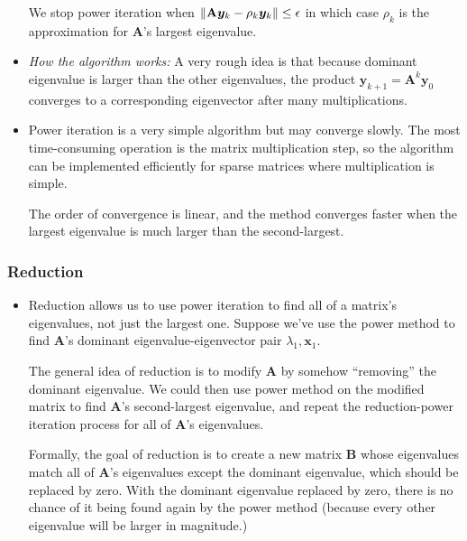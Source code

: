 \documentclass[11pt, a4paper]{article}
\newcommand{\mat}[1]{\mathbf{#1}} %
\begin{document}
\begin{itemize}
	We stop power iteration when $ \norm{\mat{A} \bm{y}_{k} - \rho_k \bm{y}_k} \leq \epsilon $ in which case $ \rho_k $ is the approximation for $ \mat{A} $'s largest eigenvalue.
	
	\item \textit{How the algorithm works:} A very rough idea is that because dominant eigenvalue is larger than the other eigenvalues, the product $ \bm{y}_{k+1} = \mat{A}^{k}\bm{y}_{0} $ converges to a corresponding eigenvector after many multiplications.
	
	
	\item Power iteration is a very simple algorithm but may converge slowly. The most time-consuming operation is the matrix multiplication step, so the algorithm can be implemented efficiently for sparse matrices where multiplication is simple. 
	
	The order of convergence is linear, and the method converges faster when the largest eigenvalue is much larger than the second-largest.
	
	
\end{itemize}
 
\subsubsection{Reduction}
\begin{itemize}
	\item Reduction allows us to use power iteration to find all of a matrix's eigenvalues, not just the largest one. Suppose we've use the power method to find $ \mat{A} $'s dominant eigenvalue-eigenvector pair $ \lambda_{1}, \bm{x}_{1} $. 
	
	The general idea of reduction is to modify $ \mat{A} $ by somehow ``removing'' the dominant eigenvalue. We could then use power method on the modified matrix to find $ \mat{A} $'s second-largest eigenvalue, and repeat the reduction-power iteration process for all of $ \mat{A} $'s eigenvalues.
	
	Formally, the goal of reduction is to create a new matrix $ \mat{B} $ whose eigenvalues match all of $ \mat{A} $'s eigenvalues except the dominant eigenvalue, which should be replaced by zero. With the dominant eigenvalue replaced by zero, there is no chance of it being found again by the power method (because every other eigenvalue will be larger in magnitude.)
	
\end{itemize}
\end{document}
